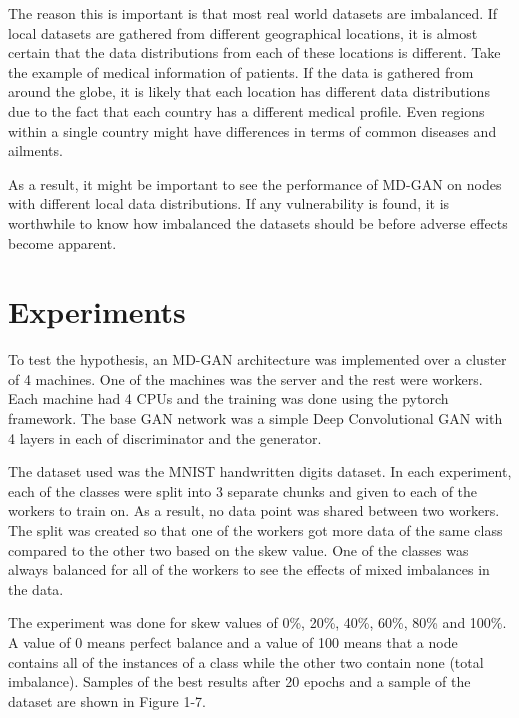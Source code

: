 \documentclass[11pt]{article}       %
\begin{document}
The reason this is important is that most real world datasets are imbalanced. If local datasets are gathered from different geographical locations, it is almost certain that the data distributions from each of these locations is different. Take the example of medical information of patients. If the data is gathered from around the globe, it is likely that each location has different data distributions due to the fact that each country has a different medical profile. Even regions within a single country might have differences in terms of common diseases and ailments.

As a result, it might be important to see the performance of MD-GAN on nodes with different local data distributions. If any vulnerability is found, it is worthwhile to know how imbalanced the datasets should be before adverse effects become apparent.

\section{Experiments} \label{expEval}

To test the hypothesis, an MD-GAN architecture was implemented over a cluster of 4 machines. One of the machines was the server and the rest were workers. Each machine had 4 CPUs and the training was done using the pytorch framework. The base GAN network was a simple Deep Convolutional GAN with 4 layers in each of discriminator and the generator. 

The dataset used was the MNIST handwritten digits dataset. In each experiment, each of the classes were split into 3 separate chunks and given to each of the workers to train on. As a result, no data point was shared between two workers. The split was created so that one of the workers got more data of the same class compared to the other two based on the skew value. One of the classes was always balanced for all of the workers to see the effects of mixed imbalances in the data.

The experiment was done for skew values of 0\%, 20\%, 40\%, 60\%, 80\% and 100\%. A value of 0 means perfect balance and a value of 100 means that a node contains all of the instances of a class while the other two contain none (total imbalance). Samples of the best results after 20 epochs and a sample of the dataset are shown in Figure 1-7.
\end{document}
